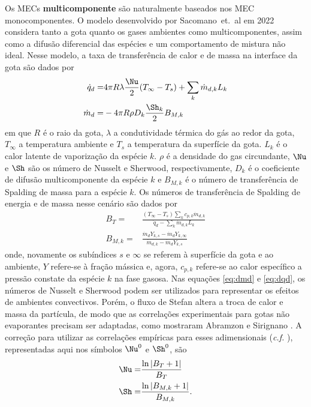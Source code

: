 Os MECs \textbf{multicomponente} são naturalmente baseados nos MEC monocomponentes.
O modelo desenvolvido por Sacomano~et.~al em 2022 \cite{SacomanoF2022IJHMT} considera tanto a gota quanto os gases ambientes como multicomponentes, assim como a difusão diferencial das espécies e um comportamento de mistura não ideal.
Nesse modelo, a taxa de transferência de calor e de massa na interface da gota são dados por 
\begin{align}
    \dot q_d =& 4\pi R \lambda \frac{\Nu}{2}(T_\infty - T_s) + \sum_k \dot m_{d,k} L_k \label{eq:dmd} \\
    \dot m_d =& -4 \pi R \rho D_k \frac{\Sh_k}{2}B_{M,k} \label{eq:dqd}
\end{align}
em que $R$ é o raio da gota, $\lambda$ a condutividade térmica do gás ao redor da gota, $T_\infty$ a temperatura ambiente e $T_s$ a temperatura da superfície da gota. 
$L_k$ é o calor latente de vaporização da espécie $k$.
$\rho$ é a densidade do gas circundante, $\Nu$ e $\Sh$ são os número de Nusselt e Sherwood, respectivamente, $D_k$ é o coeficiente de difusão multicomponente da espécie $k$ e $B_{M,k}$ é o número de transferência de Spalding de massa para a espécie $k$.
Os números de transferência de Spalding de energia e de massa nesse cenário são dados por
\begin{align}
    B_T =& \frac
        {(T_\infty - T_s) \sum_k c_{p,k}\dot m_{d,k}}
        {\dot q_d - \sum_k \dot m_{d,k} L_k} \label{eq:B_T}\\
    B_{M,k} =& \frac
        {\dot m_d Y_{k,s} - \dot m_d Y_{k,\infty}}
        {\dot m_{d,k} - \dot m_d Y_{k,s}}\label{eq:B_Mk}
\end{align}
onde, novamente os subíndices $s$ e $\infty$ se referem à superfície da gota e ao ambiente, $Y$ refere-se à fração mássica e, agora, $c_{p,k}$ refere-se ao calor específico a pressão constate da espécie $k$ na fase gasosa.
Nas equações \eqref{eq:dmd} e \eqref{eq:dqd}, os números de Nusselt e Sherwood podem ser utilizados para representar os efeitos de ambientes convectivos.
Porém, o fluxo de Stefan altera a troca de calor e massa da partícula, de modo que as correlações experimentais para gotas não evaporantes precisam ser adaptadas, como mostraram Abramzon e Sirignano \cite{Sirignano1989}.
A correção para utilizar as correlações empíricas para esses adimensionais  (\emph{c.f.} \cite[eqs. (8) e (9)]{SacomanoF2025CF}), representadas aqui nos símbolos $\Nu^0$ e $\Sh^0$, são
\begin{align}
    \Nu =& \frac{\ln \left|B_T + 1\right|}{B_T} \\
    \Sh =& \frac{\ln \left|B_{M,k} + 1\right|}{B_{M,k}}.
\end{align}

